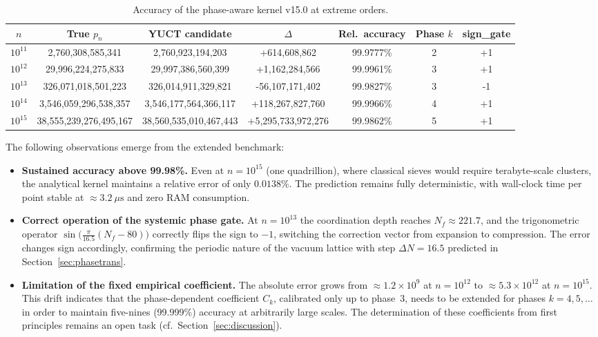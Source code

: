 \documentclass[12pt,a4paper]{article}
\begin{document}
	\begin{table}[htbp]
		\centering
		\caption{Accuracy of the phase-aware kernel v15.0 at extreme orders.}
		\label{tab:benchmark-extreme}
		\begin{tabular}{c c c c c c c}
			\toprule
			\(n\) & True \(p_n\) & YUCT candidate & \(\Delta\) & Rel.\ accuracy & Phase \(k\) & sign\_gate \\
			\midrule
			\(10^{11}\) & 2,760,308,585,341 & 2,760,923,194,203 & +614,608,862   & 99.9777\% & 2 & +1 \\
			\(10^{12}\) & 29,996,224,275,833 & 29,997,386,560,399 & +1,162,284,566 & 99.9961\% & 3 & +1 \\
			\(10^{13}\) & 326,071,018,501,223 & 326,014,911,329,821 & -56,107,171,402 & 99.9827\% & 3 & -1 \\
			\(10^{14}\) & 3,546,059,296,538,357 & 3,546,177,564,366,117 & +118,267,827,760 & 99.9966\% & 4 & +1 \\
			\(10^{15}\) & 38,555,239,276,495,167 & 38,560,535,010,467,443 & +5,295,733,972,276 & 99.9862\% & 5 & +1 \\
			\bottomrule
		\end{tabular}
	\end{table}
	
	The following observations emerge from the extended benchmark:
	
	\begin{itemize}
		\item \textbf{Sustained accuracy above 99.98\%.}
		Even at \(n = 10^{15}\) (one quadrillion), where classical sieves
		would require terabyte-scale clusters, the analytical kernel
		maintains a relative error of only \(0.0138\%\).  The prediction
		remains fully deterministic, with wall-clock time per point
		stable at \(\approx 3.2\ \mu\text{s}\) and zero RAM consumption.
		
		\item \textbf{Correct operation of the systemic phase gate.}
		At \(n = 10^{13}\) the coordination depth reaches
		\(N_f \approx 221.7\), and the trigonometric operator
		\(\sin\!\bigl(\frac{\pi}{16.5}(N_f-80)\bigr)\) correctly flips
		the sign to \(-1\), switching the correction vector from
		expansion to compression.  The error changes sign accordingly,
		confirming the periodic nature of the vacuum lattice with step
		\(\Delta N = 16.5\) predicted in Section~\ref{sec:phasetrans}.
		
		\item \textbf{Limitation of the fixed empirical coefficient.}
		The absolute error grows from \(\approx 1.2\times 10^{9}\) at
		\(n = 10^{12}\) to \(\approx 5.3\times 10^{12}\) at
		\(n = 10^{15}\).  This drift indicates that the phase-dependent
		coefficient \(C_k\), calibrated only up to phase~3, needs to be
		extended for phases \(k = 4, 5, \dots\) in order to maintain
		five-nines (99.999\%) accuracy at arbitrarily large scales.
		The determination of these coefficients from first principles
		remains an open task (cf.\ Section~\ref{sec:discussion}).
	\end{itemize}
	
\end{document}
